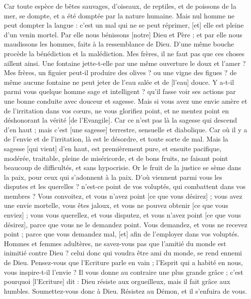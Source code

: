 \begin{multicols}{2}
Car toute espèce de bêtes sauvages, d'oiseaux, de reptiles, et de poissons de la mer, se dompte, et a été domptée par la nature humaine.
Mais nul homme ne peut dompter la langue : c'est un mal qui ne se peut réprimer, [et] elle est pleine d'un venin mortel.
Par elle nous bénissons [notre] Dieu et Père ; et par elle nous maudissons les hommes, faits à la ressemblance de Dieu.
D'une même bouche procède la bénédiction et la malédiction. Mes frères, il ne faut pas que ces choses aillent ainsi.
Une fontaine jette-t-elle par une même ouverture le doux et l'amer ?
Mes frères, un figuier peut-il produire des olives ? ou une vigne des figues ? de même aucune fontaine ne peut jeter de l'eau salée et de [l'eau] douce.
Y a-t-il parmi vous quelque homme sage et intelligent ? qu'il fasse voir ses actions par une bonne conduite avec douceur et sagesse.
Mais si vous avez une envie amère et de l'irritation dans vos cœurs, ne vous glorifiez point, et ne mentez point en déshonorant la vérité [de l'Evangile].
Car ce n'est pas là la sagesse qui descend d'en haut ; mais c'est [une sagesse] terrestre, sensuelle et diabolique.
Car où il y a de l'envie et de l'irritation, là est le désordre, et toute sorte de mal.
Mais la sagesse [qui vient] d'en haut, est premièrement pure, et ensuite pacifique, modérée, traitable, pleine de miséricorde, et de bons fruits, ne faisant point beaucoup de difficultés, et sans hypocrisie.
Or le fruit de la justice se sème dans la paix, pour ceux qui s'adonnent à la paix.
\VerseOne{}D'où viennent parmi vous les disputes et les querelles ? n'est-ce point de vos voluptés, qui combattent dans vos membres ?
Vous convoitez, et vous n'avez point [ce que vous désirez] ; vous avez une envie mortelle, vous êtes jaloux, et vous ne pouvez obtenir [ce que vous enviez] ; vous vous querellez, et vous disputez, et vous n'avez point [ce que vous désirez], parce que vous ne le demandez point.
Vous demandez, et vous ne recevez point ; parce que vous demandez mal, [et] afin de l'employer dans vos voluptés.
Hommes et femmes adultères, ne savez-vous pas que l'amitié du monde est inimitié contre Dieu ? celui donc qui voudra être ami du monde, se rend ennemi de Dieu.
Pensez-vous que l'Ecriture parle en vain ; l'Esprit qui a habité en nous, vous inspire-t-il l'envie ?
Il vous donne au contraire une plus grande grâce ; c'est pourquoi [l'Ecriture] dit : Dieu résiste aux orgueilleux, mais il fait grâce aux humbles.
Soumettez-vous donc à Dieu. Résistez au Démon, et il s'enfuira de vous.

\end{multicols}

